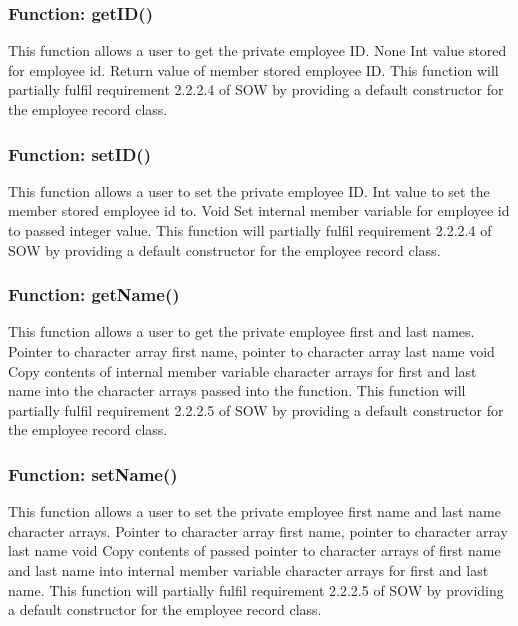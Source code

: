 \documentclass[12pt]{article}%
\newcounter{subsubsubsection}[subsubsection]
\begin{document}
\subsubsection{Function:  getID()}
This function allows a user to get the private employee ID.
None
Int value stored for employee id.
Return value of member stored employee ID.
This function will partially fulfil requirement 2.2.2.4 of SOW by providing a default constructor for the
employee record class.

\subsubsection{Function:  setID()}
This function allows a user to set the private employee ID.
Int value to set the member stored employee id to.
Void
Set internal member variable for employee id to passed integer value.
This function will partially fulfil requirement 2.2.2.4 of SOW by providing a default constructor for the
employee record class.


\subsubsection{Function:  getName()}
This function allows a user to get the private employee first and last names.
Pointer to character array first name, pointer to character array last name
void
Copy contents of internal member variable character arrays for first and last name into the
character arrays passed into the function.
This function will partially fulfil requirement 2.2.2.5 of SOW by providing a default constructor for the
employee record class.


\subsubsection{Function:  setName()}
This function allows a user to set the private employee first name and last name character arrays.
Pointer to character array first name, pointer to character array last name
void
Copy contents of passed pointer to character arrays of first name and last name into internal member variable character arrays for first and last name.
This function will partially fulfil requirement 2.2.2.5 of SOW by providing a default constructor for the
employee record class.
\end{document}

